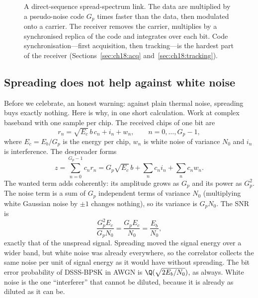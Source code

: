\begin{figure}[htbp]
\caption{A direct-sequence spread-spectrum link. The data are multiplied by a pseudo-noise
code $G_p$ times faster than the data, then modulated onto a carrier. The receiver removes
the carrier, multiplies by a synchronised replica of the code and integrates over each bit.
Code synchronisation---first acquisition, then tracking---is the hardest part of the
receiver (Sections~\ref{sec:ch18:acq} and~\ref{sec:ch18:tracking}).}
\label{fig:ch18_dsss_chain}
\end{figure}

\subsection{Spreading does not help against white noise}
\label{sec:ch18:awgn}

Before we celebrate, an honest warning: against plain thermal noise, spreading buys exactly
nothing. Here is why, in one short calculation. Work at complex baseband with one sample per chip.
The received chips of one bit are
\begin{equation}
r_n=\sqrt{E_c}\,b\,c_n+i_n+w_n,\qquad n=0,\dots,G_p-1,
\end{equation}
where $E_c=E_b/G_p$ is the energy per chip, $w_n$ is white noise of variance $N_0$ and $i_n$
is interference. The despreader forms
\begin{equation}
z=\sum_{n=0}^{G_p-1}c_nr_n=G_p\sqrt{E_c}\,b+\sum_nc_ni_n+\sum_nc_nw_n.
\label{eq:ch18:despread}
\end{equation}
The wanted term adds coherently: its amplitude grows as $G_p$ and its power as $G_p^2$.
The noise term is a sum of $G_p$ independent terms of variance $N_0$ (multiplying white
Gaussian noise by $\pm1$ changes nothing), so its variance is $G_pN_0$. The SNR is
\begin{equation}
\frac{G_p^2E_c}{G_pN_0}=\frac{G_pE_c}{N_0}=\frac{E_b}{N_0},
\end{equation}
exactly that of the unspread signal. Spreading moved the signal energy over a wider band,
but white noise was already everywhere, so the correlator collects the same noise per unit
of signal energy as it would have without spreading. The bit error probability of DSSS-BPSK
in AWGN is $\Q(\sqrt{2E_b/N_0})$, as always. White noise is the one ``interferer'' that cannot be
diluted, because it is already as diluted as it can be.

